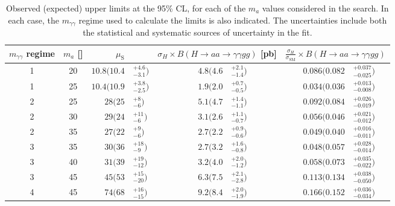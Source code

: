 \begin{table}[t]
  \begin{center}
    \caption{Observed (expected) upper limits at the 95\% CL, for each of the $m_a$ values considered in the search.
      In each case, the $m_{\gamma\gamma}$ regime used to calculate the limits is also indicated.
      The uncertainties include both the statistical and systematic sources of uncertainty in the fit.}
    \label{tab:limits}
          {\footnotesize
            \bgroup
            \def\arraystretch{1.5}
            \begin{tabular}{ccr@{}lr@{}lr@{}l}
	    \hline
            $m_{\gamma\gamma}$ regime & $m_a$ [\GeV{}] & \multicolumn{2}{c}{$\mu_\text{S}$}   & \multicolumn{2}{c}{$\sigma_H\times B(H\to aa \to \gamma\gamma gg)$ [pb]}  & \multicolumn{2}{c}{$\frac{\sigma_H}{\sigma_\text{SM}}\times B(H\to aa \to \gamma\gamma gg)$} \\
	    \hline
            1 & 20 & $10.8\Big(10.4$&$^{+4.6}_{-3.1}\Big)$   & \hspace{1.1cm}$4.8\Big(4.6$&$^{+2.1}_{-1.4}\Big)$  & \hspace{0.505cm}$0.086\Big(0.082$&$^{+0.037}_{-0.025}\Big)$ \\
            1 & 25 & $10.4\Big(10.9$&$^{+3.8}_{-2.5}\Big)$   & $1.9\Big(2.0$&$^{+0.7}_{-0.5}\Big)$  & $0.034\Big(0.036$&$^{+0.013}_{-0.008}\Big)$ \\
            2 & 25 & $28\Big(25$&$^{+8}_{-6}\Big)$   & $5.1\Big(4.7$&$^{+1.4}_{-1.1}\Big)$  & $0.092\Big(0.084$&$^{+0.026}_{-0.019}\Big)$ \\
            2 & 30 & $29\Big(24$&$^{+11}_{-6}\Big)$  & $3.1\Big(2.6$&$^{+1.1}_{-0.7}\Big)$ & $0.056\Big(0.046$&$^{+0.021}_{-0.012}\Big)$ \\
            2 & 35 & $27\Big(22$&$^{+9}_{-6}\Big)$   & $2.7\Big(2.2$&$^{+0.9}_{-0.6}\Big)$ & $0.049\Big(0.040$&$^{+0.016}_{-0.011}\Big)$  \\
            3 & 35 & $30\Big(36$&$^{+18}_{-9}\Big)$  & $2.7\Big(3.2$&$^{+1.6}_{-0.8}\Big)$ & $0.048\Big(0.057$&$^{+0.028}_{-0.014}\Big)$  \\
            3 & 40 & $31\Big(39$&$^{+19}_{-12}\Big)$ & $3.2\Big(4.0$&$^{+2.0}_{-1.2}\Big)$  & $0.058\Big(0.073$&$^{+0.035}_{-0.022}\Big)$ \\
            3 & 45 & $45\Big(53$&$^{+15}_{-20}\Big)$ & $6.3\Big(7.5$&$^{+2.1}_{-2.8}\Big)$   & $0.113\Big(0.134$&$^{+0.038}_{-0.050}\Big)$     \\
            4 & 45 & $74\Big(68$&$^{+16}_{-15}\Big)$ & $9.2\Big(8.4$&$^{+2.0}_{-1.9}\Big)$  & $0.166\Big(0.152$&$^{+0.036}_{-0.034}\Big)$ \\

\end{tabular}}
\end{center}
\end{table}
